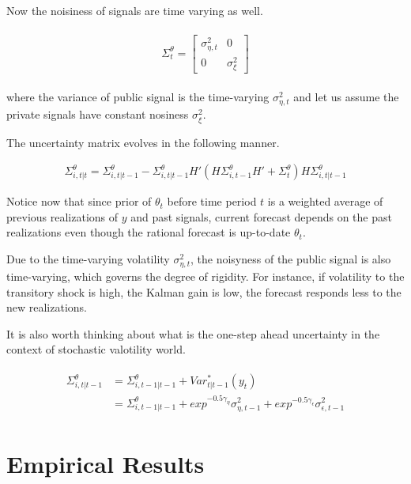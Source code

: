 \documentclass[12pt]{article}
\begin{document}
	Now the noisiness of signals are time varying as well. 
	
	\begin{eqnarray}
	\begin{split}
	\Sigma^\theta_t =  \left[ \begin{matrix} 
	\sigma^2_{\eta,t} &  0 \\ 
	0 & \sigma^2_\xi \end{matrix}\right] 
	\end{split}               
	\end{eqnarray}
	
	where the variance of public signal is the time-varying $\sigma^2_{\eta,t}$ and let us assume the private signals have constant nosiness $\sigma^2_{\xi}$.
	
	The uncertainty matrix evolves in the following manner. 
	
	\begin{eqnarray}
	\Sigma^\theta_{i,t|t} = \Sigma^\theta_{i,t|t-1} - \Sigma^\theta_{i,t|t-1} H'(H \Sigma^\theta_{i,t-1} H' +\Sigma^\theta_{t}) H \Sigma^\theta_{i,t|t-1} 
	\end{eqnarray}
	
	Notice now that since prior of $\theta_t$ before time period $t$ is a weighted average of previous realizations of $y$ and past signals, current forecast depends on the past realizations even though the rational forecast is up-to-date $\theta_t$. 
	
	Due to the time-varying volatility $\sigma^2_{\eta,t}$, the noisyness of the public signal is also time-varying, which governs the degree of rigidity. For instance, if volatility to the transitory shock is high, the Kalman gain is low, the forecast responds less to the new realizations. 
	
	It is also worth thinking about what is the one-step ahead uncertainty in the context of stochastic valotility world. 
	
	
	\begin{eqnarray}
	\begin{split}
	\Sigma^\theta_{i,t|t-1} & = \Sigma^\theta_{i,t-1|t-1} + Var^*_{t|t-1}(y_t) \\
	& = \Sigma^\theta_{i,t-1|t-1} +  exp^{- 0.5\gamma_{\eta}} \sigma^2_{\eta,t-1}  +  exp^{- 0.5\gamma_{\epsilon}} \sigma^2_{\epsilon,t-1} 
	\end{split}
	\end{eqnarray}
	
	
	
	\section{Empirical Results}\label{empirical}
	
\end{document}

